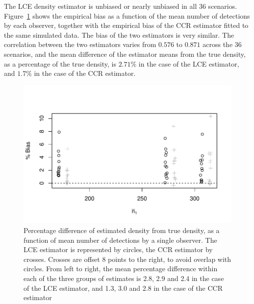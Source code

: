 \documentclass[useAMS, usenatbib, referee]{biom}\usepackage[]{graphicx}\usepackage[]{color}
\makeatletter
\def\maxwidth{ %
  \ifdim\Gin@nat@width>\linewidth
    \linewidth
  \else
    \Gin@nat@width
  \fi
}
\newenvironment{knitrout}{}{} %
\makeatother
\begin{document}
The LCE density estimator is unbiased or nearly unbiased in all 36 scenarios. Figure~\ref{fig:fig_mlepalm_bias_bcs} shows the empirical bias as a function of the mean number of detections by each observer, together with the empirical bias of the CCR estimator fitted to the same simulated data. The bias of the two estimators is very similar. The correlation between the two estimators varies from $0.576$ to $0.871$ across the 36 scenarios, and the mean difference of the estimator means from the true density, as a percentage of the true density, is $2.71\%$ in the case of the LCE estimator, and $1.7\%$ in the case of the CCR estimator.

\begin{knitrout}
\color{fgcolor}\begin{figure}

{\centering \includegraphics[width=\maxwidth]{figs/fig_mlepalm_bias_bcs-1} 

}

\caption[Percentage difference of estimated density from true density, as a function of mean number of detections by a single observer]{Percentage difference of estimated density from true density, as a function of mean number of detections by a single observer. The LCE estimator is represented by circles, the CCR estimator by crosses. Crosses are offset 8 points to the right, to avoid overlap with circles. From left to right, the mean percentage difference within each of the three groups of estimates is 2.8, 2.9 and 2.4 in the case of the LCE estimator, and 1.3, 3.0 and 2.8 in the case of the CCR estimator }\label{fig:fig_mlepalm_bias_bcs}
\end{figure}


\end{knitrout}
\end{document}
